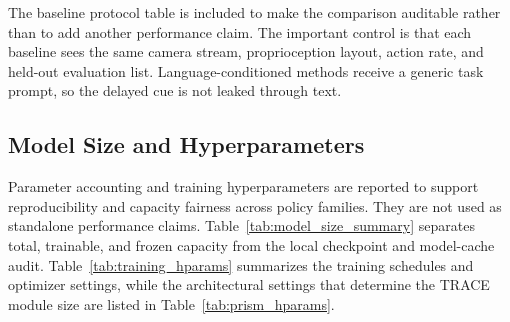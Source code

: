 \documentclass{article}
\begin{document}
\begin{table}[H]
    \centering
    \caption{External VLA baseline protocol. Language conditioned models receive only a generic task prompt.}
    \label{tab:baseline_protocols}
    \setlength{\tabcolsep}{3.5pt}
    \renewcommand{\arraystretch}{1.05}
\end{table}

The baseline protocol table is included to make the comparison auditable rather than to add another performance claim. The important control is that each baseline sees the same camera stream, proprioception layout, action rate, and held-out evaluation list. Language-conditioned methods receive a generic task prompt, so the delayed cue is not leaked through text.

\subsection{Model Size and Hyperparameters}
\label{app:model_size_hparams}

Parameter accounting and training hyperparameters are reported to support reproducibility and capacity fairness across policy families. They are not used as standalone performance claims. Table~\ref{tab:model_size_summary} separates total, trainable, and frozen capacity from the local checkpoint and model-cache audit. Table~\ref{tab:training_hparams} summarizes the training schedules and optimizer settings, while the architectural settings that determine the TRACE module size are listed in Table~\ref{tab:prism_hparams}.
\end{document}
